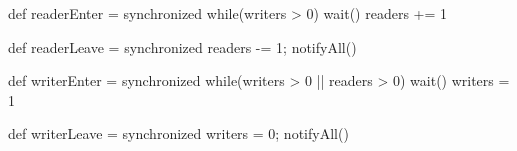 
\begin{slide}

\begin{scala}
  def readerEnter = synchronized{
    while(writers > 0) wait()
    readers += 1
  }

  def readerLeave = synchronized{
    readers -= 1; notifyAll()
  }

  def writerEnter = synchronized{
    while(writers > 0 || readers > 0) wait()
    writers = 1
  }
      
  def writerLeave = synchronized{
    writers = 0; notifyAll()
  }
\end{scala}
\end{slide}













      

